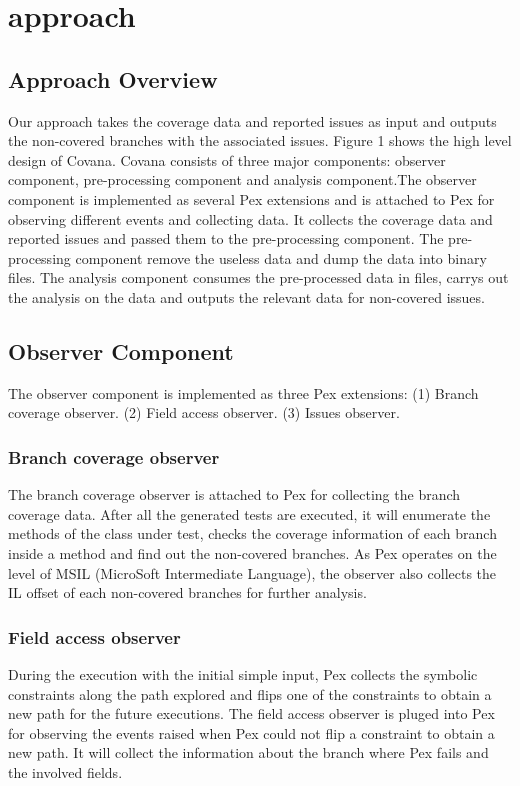 \section{approach}
\subsection{Approach Overview}
Our approach takes the coverage data and reported issues as input and outputs the non-covered branches with the associated issues. Figure 1 shows the high level design of Covana. Covana consists of three major components: observer component, pre-processing component and analysis component.The observer component is implemented as several Pex extensions and is attached to Pex for observing different events and collecting data. It collects the coverage data and reported issues and passed them to the pre-processing component. The pre-processing component remove the useless data and dump the data into binary files. The analysis component consumes the pre-processed data in files, carrys out the analysis on the data and outputs the relevant data for non-covered issues.
\subsection{Observer Component}
The observer component is implemented as three Pex extensions: (1) Branch coverage observer. (2) Field access observer. (3) Issues observer.
\subsubsection{Branch coverage observer}
The branch coverage observer is attached to Pex for collecting the branch coverage data. After all the generated tests are executed, it will enumerate the methods of the class under test, checks the coverage information of each branch inside a method and find out the non-covered branches. As Pex operates on the level of MSIL (MicroSoft Intermediate Language)\cite{HalleuxT08}, the observer also collects the IL offset of each non-covered branches for further analysis.
\subsubsection{Field access observer}
During the execution with the initial simple input, Pex collects the symbolic constraints along the path explored and flips one of the constraints to obtain a new path for the future executions. The field access observer is pluged into Pex for observing the events raised when Pex could not flip a constraint to obtain a new path. It will collect the information about the branch where Pex fails and the involved fields. 
